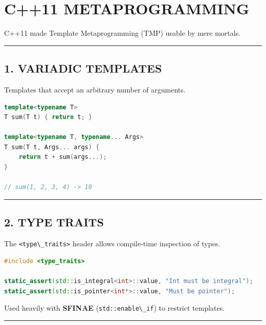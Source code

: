 \hypertarget{c11-metaprogramming}{%
\chapter{C++11 METAPROGRAMMING}\label{c11-metaprogramming}}

C++11 made Template Metaprogramming (TMP) usable by mere mortals.

\begin{center}\rule{0.5\linewidth}{0.5pt}\end{center}

\hypertarget{variadic-templates}{%
\section{1. VARIADIC TEMPLATES}\label{variadic-templates}}

Templates that accept an arbitrary number of arguments.

\begin{lstlisting}[language={C++}]
template<typename T>
T sum(T t) { return t; }

template<typename T, typename... Args>
T sum(T t, Args... args) {
    return t + sum(args...);
}

// sum(1, 2, 3, 4) -> 10
\end{lstlisting}

\begin{center}\rule{0.5\linewidth}{0.5pt}\end{center}

\hypertarget{type-traits}{%
\section{2. TYPE TRAITS}\label{type-traits}}

The \passthrough{\lstinline!<type\_traits>!} header allows compile-time
inspection of types.

\begin{lstlisting}[language={C++}]
#include <type_traits>

static_assert(std::is_integral<int>::value, "Int must be integral");
static_assert(std::is_pointer<int*>::value, "Must be pointer");
\end{lstlisting}

Used heavily with \textbf{SFINAE}
(\passthrough{\lstinline!std::enable\_if!}) to restrict templates.

\begin{center}\rule{0.5\linewidth}{0.5pt}\end{center}

